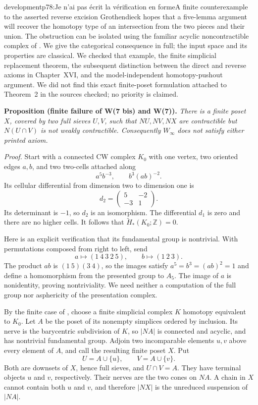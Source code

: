 \begin{dcomment}{development}{p78:Je n'ai pas écrit la vérification en forme}{A finite counterexample to the asserted reverse excision}
Grothendieck hopes that a five-lemma argument will recover the homotopy type of an intersection from the two pieces and their union. The obstruction can be isolated using the familiar acyclic noncontractible complex of \citet[Example~2.38]{Hatcher2002}. We give the categorical consequence in full; the input space and its properties are classical. We checked that example, the finite simplicial replacement theorem, the subsequent distinction between the direct and reverse axioms in Chapter~XVI, and the model-independent homotopy-pushout argument. We did not find this exact finite-poset formulation attached to Theorem~2 in the sources checked; no priority is claimed.

\textbf{Proposition (finite failure of W(7 bis) and W(7)).}\ours
\emph{There is a finite poset $X$, covered by two full sieves $U,V$, such that $NU,NV,NX$ are contractible but $N(U\cap V)$ is not weakly contractible. Consequently $W_\infty$ does not satisfy either printed axiom.}

\emph{Proof.} Start with a connected CW complex $K_0$ with one vertex, two oriented edges $a,b$, and two two-cells attached along
\[
 a^5b^{-3},\qquad b^3(ab)^{-2}.
\]
Its cellular differential from dimension two to dimension one is
\[
 d_2=\begin{pmatrix}5&-2\\-3&1\end{pmatrix}.
\]
Its determinant is $-1$, so $d_2$ is an isomorphism. The differential $d_1$ is zero and there are no higher cells. It follows that $\widetilde H_*(K_0;\mathbb Z)=0$.

Here is an explicit verification that its fundamental group is nontrivial. With permutations composed from right to left, send
\[
 a\longmapsto(1\ 4\ 3\ 2\ 5),\qquad
 b\longmapsto(1\ 2\ 3).
\]
The product $ab$ is $(1\ 5)(3\ 4)$, so the images satisfy $a^5=b^3=(ab)^2=1$ and define a homomorphism from the presented group to $A_5$. The image of $a$ is nonidentity, proving nontriviality. We need neither a computation of the full group nor asphericity of the presentation complex.

By the finite case of \citet[Theorem~2C.5]{Hatcher2002}, choose a finite simplicial complex $K$ homotopy equivalent to $K_0$. Let $A$ be the poset of its nonempty simplices ordered by inclusion. Its nerve is the barycentric subdivision of $K$, so $|NA|$ is connected and acyclic, and has nontrivial fundamental group. Adjoin two incomparable elements $u,v$ above every element of $A$, and call the resulting finite poset $X$. Put
\[
 U=A\cup\{u\},\qquad V=A\cup\{v\}.
\]
Both are downsets of $X$, hence full sieves, and $U\cap V=A$. They have terminal objects $u$ and $v$, respectively. Their nerves are the two cones on $NA$. A chain in $X$ cannot contain both $u$ and $v$, and therefore $|NX|$ is the unreduced suspension of $|NA|$.


\end{dcomment}
